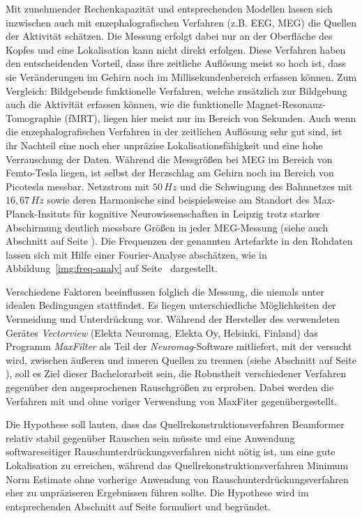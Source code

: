 \documentclass[doc,a4paper,12pt]{apa6}
\makeatletter
\DeclareRobustCommand*{\nameref}[1]{%
      \glqq{\myorg@nameref{#1}}\grqq%
    }%
\makeatother
\begin{document}
Mit zunehmender Rechenkapazität und entsprechenden Modellen lassen sich inzwischen auch mit enzephalografischen Verfahren (z.B. EEG, MEG) die Quellen der Aktivität schätzen. Die Messung erfolgt dabei nur an der Oberfläche des Kopfes und eine Lokalisation kann nicht direkt erfolgen. Diese Verfahren haben den entscheidenden Vorteil, dass ihre zeitliche Auflösung meist so hoch ist, dass sie Veränderungen im Gehirn noch im Millisekundenbereich erfassen können. Zum Vergleich: Bildgebende funktionelle Verfahren, welche zusätzlich zur Bildgebung auch die Aktivität erfassen können, wie die funktionelle Magnet-Resonanz-Tomographie (fMRT), liegen hier meist nur im Bereich von Sekunden. Auch wenn die enzephalografischen Verfahren in der zeitlichen Auflösung sehr gut sind, ist ihr Nachteil eine noch eher unpräzise Lokalisationsfähigkeit und eine hohe Verrauschung der Daten. Während die Messgrößen bei MEG im Bereich von Femto-Tesla liegen, ist selbst der Herzschlag am Gehirn noch im Bereich von Picotesla messbar. Netzstrom mit $50\,Hz$ und die Schwingung des Bahnnetzes mit $16,67\,Hz$ sowie deren Harmonische sind beispielsweise am Standort des Max-Planck-Insituts für kognitive Neurowissenschaften in Leipzig trotz starker Abschirmung deutlich messbare Größen in jeder MEG-Messung (siehe auch Abschnitt \nameref{sec:rauschen} auf Seite \pageref{sec:rauschen}). Die Frequenzen der genannten Artefarkte in den Rohdaten lassen sich mit Hilfe einer Fourier-Analyse abschätzen, wie in Abbildung~\ref{img:freq-analy} auf Seite~\pageref{img:freq-analy} dargestellt.

Verschiedene Faktoren beeinflussen folglich die Messung, die niemals unter idealen Bedingungen stattfindet. Es liegen unterschiedliche Möglichkeiten der Vermeidung und Unterdrückung vor. Während der Hersteller des verwendeten Gerätes \emph{Vectorview} (Elekta Neuromag, Elekta Oy, Helsinki, Finland) das Programm \emph{MaxFilter} als Teil der \emph{Neuromag}-Software mitliefert, mit der versucht wird, zwischen äußeren und inneren Quellen zu trennen (siehe Abschnitt \nameref{sec:maxfilter} auf Seite \pageref{sec:maxfilter}), soll es Ziel dieser Bachelorarbeit sein, die Robustheit verschiedener Verfahren gegenüber den angesprochenen Rauschgrößen zu erproben. Dabei werden die Verfahren mit und ohne voriger Verwendung von MaxFiter gegenübergestellt.

Die Hypothese soll lauten, dass das Quellrekonstruktionsverfahren Beamformer relativ stabil gegenüber Rauschen sein müsste und eine Anwendung softwareseitiger Rauschunterdrückungsverfahren nicht nötig ist, um eine gute Lokalisation zu erreichen, während das Quellrekonstruktionsverfahren Minimum Norm Estimate ohne vorherige Anwendung von Rauschunterdrückungsverfahren eher zu unpräziseren Ergebnissen führen sollte. Die Hypothese wird im entsprechenden Abschnitt auf Seite \pageref{sec:hypo} formuliert und begründet.
\end{document}
